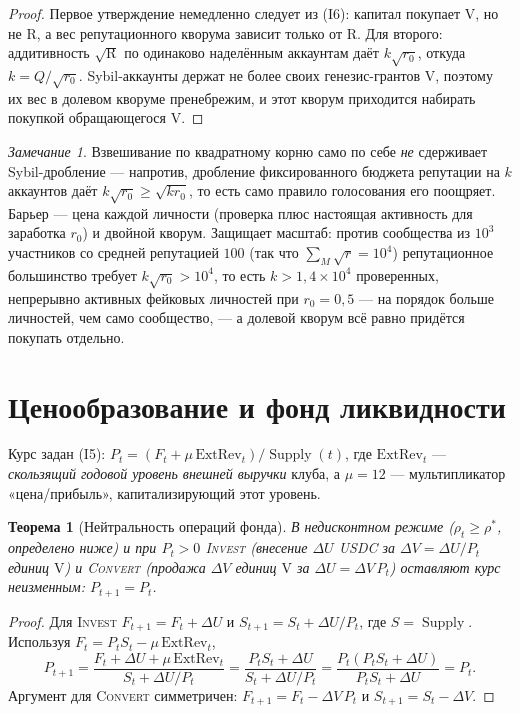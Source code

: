 \documentclass[11pt]{article}
\theoremstyle{plain}
\newtheorem{theorem}{Теорема}
\theoremstyle{definition}
\theoremstyle{remark}
\newtheorem{remark}{Замечание}
\newcommand{\V}{\mathrm{V}}
\newcommand{\R}{\mathrm{R}}
\newcommand{\Supply}{\operatorname{Supply}}
\newcommand{\ExtRev}{\mathrm{ExtRev}}
\begin{document}
\begin{proof}
Первое утверждение немедленно следует из (I6): капитал покупает $\V$, но не $\R$, а вес репутационного кворума зависит только от $\R$. Для второго: аддитивность $\sqrt{\R}$ по одинаково наделённым аккаунтам даёт $k\sqrt{r_0}$, откуда $k=Q/\sqrt{r_0}$. Sybil-аккаунты держат не более своих генезис-грантов $\V$, поэтому их вес в долевом кворуме пренебрежим, и этот кворум приходится набирать покупкой обращающегося $\V$.
\end{proof}

\begin{remark}
Взвешивание по квадратному корню само по себе \emph{не} сдерживает Sybil-дробление --- напротив, дробление фиксированного бюджета репутации на $k$ аккаунтов даёт $k\sqrt{r_0}\ge\sqrt{kr_0}$, то есть само правило голосования его поощряет. Барьер --- цена каждой личности (проверка плюс настоящая активность для заработка $r_0$) и двойной кворум. Защищает масштаб: против сообщества из $10^3$ участников со средней репутацией $100$ (так что $\sum_M\sqrt{r}=10^4$) репутационное большинство требует $k\sqrt{r_0}>10^4$, то есть $k>1{,}4\times10^4$ проверенных, непрерывно активных фейковых личностей при $r_0=0{,}5$ --- на порядок больше личностей, чем само сообщество, --- а долевой кворум всё равно придётся покупать отдельно.
\end{remark}

\section{Ценообразование и фонд ликвидности}

Курс задан (I5): $P_t = (F_t + \mu\,\ExtRev_t)/\Supply(t)$, где $\ExtRev_t$ --- \emph{скользящий годовой уровень внешней выручки} клуба, а $\mu = 12$ --- мультипликатор «цена/прибыль», капитализирующий этот уровень.

\begin{theorem}[Нейтральность операций фонда]\label{thm:neutrality}
В недисконтном режиме ($\rho_t\ge\rho^*$, определено ниже) и при $P_t>0$ \textnormal{\textsc{Invest}} (внесение $\Delta U$ USDC за $\Delta V = \Delta U/P_t$ единиц $\V$) и \textnormal{\textsc{Convert}} (продажа $\Delta V$ единиц $\V$ за $\Delta U = \Delta V\,P_t$) оставляют курс неизменным: $P_{t+1} = P_t$.
\end{theorem}

\begin{proof}
Для \textsc{Invest} $F_{t+1} = F_t + \Delta U$ и $S_{t+1} = S_t + \Delta U/P_t$, где $S=\Supply$. Используя $F_t = P_t S_t - \mu\,\ExtRev_t$,
\[
P_{t+1} = \frac{F_t + \Delta U + \mu\,\ExtRev_t}{S_t + \Delta U/P_t}
= \frac{P_t S_t + \Delta U}{S_t + \Delta U/P_t}
= \frac{P_t(P_t S_t + \Delta U)}{P_t S_t + \Delta U} = P_t.
\]
Аргумент для \textsc{Convert} симметричен: $F_{t+1} = F_t - \Delta V\,P_t$ и $S_{t+1} = S_t - \Delta V$.
\end{proof}
\end{document}
